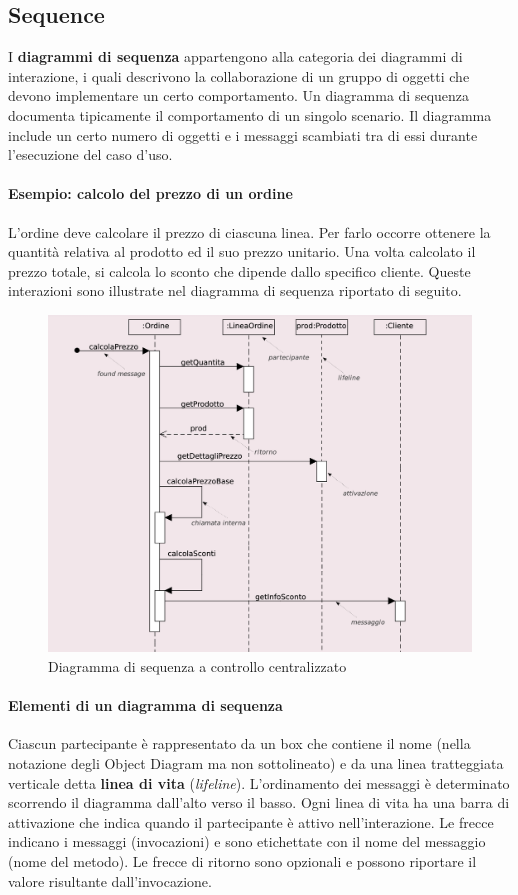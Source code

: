 \subsection{Sequence}

I \textbf{diagrammi di sequenza} appartengono alla categoria dei diagrammi di interazione, i quali descrivono la collaborazione di un gruppo di oggetti che devono implementare un certo comportamento. Un diagramma di sequenza documenta tipicamente il comportamento di un singolo scenario. Il diagramma include un certo numero di oggetti e i messaggi scambiati tra di essi durante l’esecuzione del caso d’uso.

\paragraph{Esempio: calcolo del prezzo di un ordine}
L’ordine deve calcolare il prezzo di ciascuna linea. Per farlo occorre ottenere la quantità relativa al prodotto ed il suo prezzo unitario. Una volta calcolato il prezzo totale, si calcola lo sconto che dipende dallo specifico cliente. Queste interazioni sono illustrate nel diagramma di sequenza riportato di seguito.

\begin{figure}[H]
    \centering
    \includegraphics[width=0.75\linewidth]{assets/UML/sequence/sequence-1.png}
    \caption{Diagramma di sequenza a controllo centralizzato}
\end{figure}

\paragraph{Elementi di un diagramma di sequenza}
Ciascun partecipante è rappresentato da un box che contiene il nome (nella notazione degli Object Diagram ma non sottolineato) e da una linea tratteggiata verticale detta \textbf{linea di vita} (\textit{lifeline}). L’ordinamento dei messaggi è determinato scorrendo il diagramma dall’alto verso il basso. Ogni linea di vita ha una barra di attivazione che indica quando il partecipante è attivo nell’interazione. Le frecce indicano i messaggi (invocazioni) e sono etichettate con il nome del messaggio (nome del metodo). Le frecce di ritorno sono opzionali e possono riportare il valore risultante dall’invocazione.

